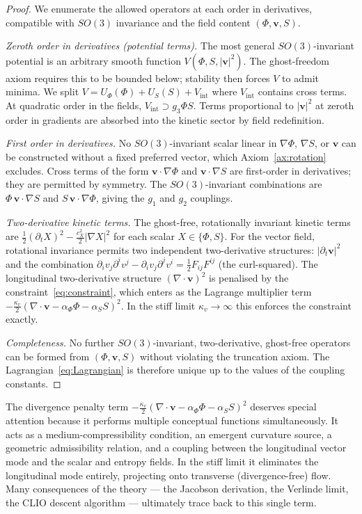 \documentclass[12pt, a4paper]{article}
\theoremstyle{plain}
\theoremstyle{definition}
\theoremstyle{remark}
\newcommand{\vfield}{\mathbf{v}}
\newcommand{\divv}{\nabla\!\cdot\!\vfield}
\begin{document}
\begin{proof}
We enumerate the allowed operators at each order in derivatives, compatible with $SO(3)$
invariance and the field content $(\Phi, \vfield, S)$.

\emph{Zeroth order in derivatives (potential terms).}  The most general $SO(3)$-invariant
potential is an arbitrary smooth function $V(\Phi, S, |\vfield|^2)$.  The ghost-freedom
axiom requires this to be bounded below; stability then forces $V$ to admit minima. We
split $V = U_\Phi(\Phi) + U_S(S) + V_{\mathrm{int}}$ where $V_{\mathrm{int}}$ contains
cross terms.  At quadratic order in the fields, $V_{\mathrm{int}} \supset g_3 \Phi S$.
Terms proportional to $|\vfield|^2$ at zeroth order in gradients are absorbed into the
kinetic sector by field redefinition.

\emph{First order in derivatives.}  No $SO(3)$-invariant scalar linear in $\nabla\Phi$,
$\nabla S$, or $\vfield$ can be constructed without a fixed preferred vector, which
Axiom~\ref{ax:rotation} excludes.  Cross terms of the form $\vfield\cdot\nabla\Phi$ and
$\vfield\cdot\nabla S$ are first-order in derivatives; they are permitted by symmetry.
The $SO(3)$-invariant combinations are $\Phi\,\vfield\cdot\nabla S$ and
$S\,\vfield\cdot\nabla\Phi$, giving the $g_1$ and $g_2$ couplings.

\emph{Two-derivative kinetic terms.}  The ghost-free, rotationally invariant kinetic terms
are $\tfrac{1}{2}(\partial_t X)^2 - \tfrac{c_X^2}{2}|\nabla X|^2$ for each scalar
$X \in \{\Phi, S\}$.  For the vector field, rotational invariance permits two independent
two-derivative structures: $|\partial_t \vfield|^2$ and the combination
$\partial_i v_j \partial^i v^j - \partial_i v_j \partial^j v^i = \tfrac{1}{2}F_{ij}F^{ij}$ (the
curl-squared).  The longitudinal two-derivative structure $(\divv)^2$ is penalised by
the constraint~\eqref{eq:constraint}, which enters as the Lagrange multiplier term
$-\tfrac{\kappa_v}{2}(\divv - \alpha_\Phi\Phi - \alpha_S S)^2$. In the stiff limit
$\kappa_v \to \infty$ this enforces the constraint exactly.

\emph{Completeness.}  No further $SO(3)$-invariant, two-derivative, ghost-free operators
can be formed from $(\Phi, \vfield, S)$ without violating the truncation axiom.  The
Lagrangian~\eqref{eq:Lagrangian} is therefore unique up to the values of the coupling
constants.
\end{proof}

The divergence penalty term $-\tfrac{\kappa_v}{2}(\divv - \alpha_\Phi\Phi - \alpha_S S)^2$
deserves special attention because it performs multiple conceptual functions simultaneously.
It acts as a medium-compressibility condition, an emergent curvature source, a geometric
admissibility relation, and a coupling between the longitudinal vector mode and the scalar
and entropy fields.  In the stiff limit it eliminates the longitudinal mode entirely,
projecting onto transverse (divergence-free) flow.  Many consequences of the theory
--- the Jacobson derivation, the Verlinde limit, the CLIO descent algorithm --- ultimately
trace back to this single term.
\end{document}

